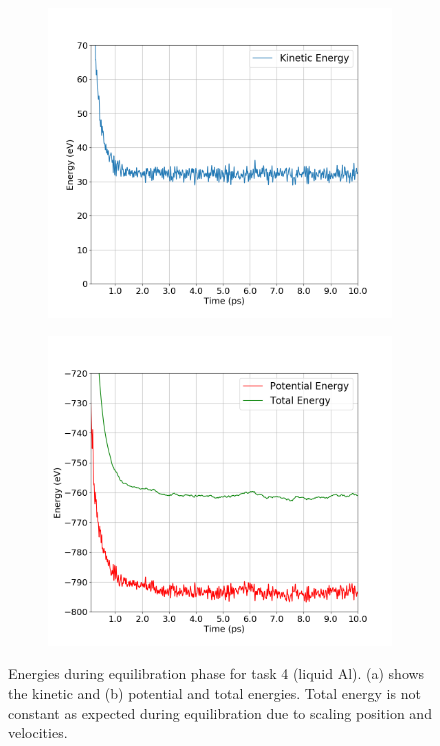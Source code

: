 \begin{figure}[!htbp]
	\begin{subfigure}[b]{0.5\textwidth}
		\includegraphics[width=\textwidth]{figs/task4-k.png} 
		\caption{}
	\end{subfigure}%
	\begin{subfigure}[b]{0.5\textwidth}
		\includegraphics[width=\textwidth]{figs/task4-e-p.png} 
		\caption{}
	\end{subfigure}
	\caption{Energies during equilibration phase for task 4 (liquid Al). (a) shows the kinetic and (b) potential and total energies. Total energy is not constant as expected during equilibration due to scaling position and velocities.}
	\label{fig4-1}
\end{figure}

